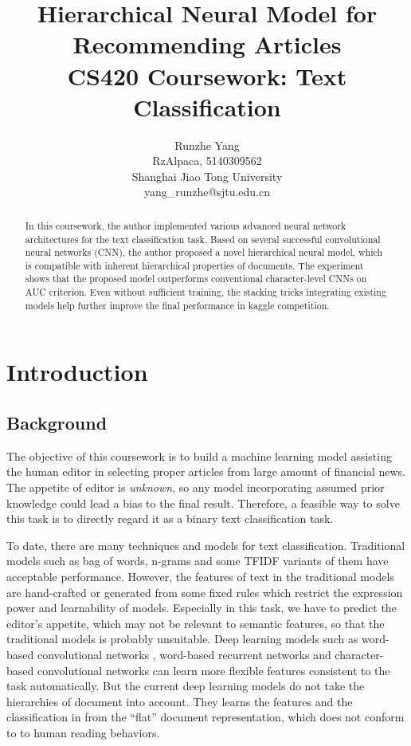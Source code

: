 \documentclass{article}
\title{Hierarchical Neural Model for Recommending Articles\\
		\Large{CS420 Coursework: Text Classification}}
\author{Runzhe Yang\\
{\small RzAlpaca, 5140309562} \\
{\small Shanghai Jiao Tong University}\\
{\small \textsf{yang\_runzhe@sjtu.edu.cn}}}
\begin{document}
\maketitle

\begin{abstract}
In this coursework, the author implemented various advanced neural network architectures for the text classification task. Based on several successful convolutional neural networks (CNN), the author proposed a novel hierarchical neural model, which is compatible with inherent hierarchical properties of documents. The experiment shows that the proposed model outperforms conventional character-level CNNs on AUC criterion. Even without sufficient training, the stacking tricks integrating existing models help further improve the final performance in kaggle competition.
\end{abstract}

\section{Introduction}\label{sec:intro}
\subsection{Background}\label{sec:bg}
The objective of this coursework is to build a machine learning model assisting the human editor in selecting proper articles from large amount of financial news. The appetite of editor is {\em unknown}, so any model incorporating assumed prior knowledge could lead a bias to the final result. Therefore, a feasible way to solve this task is to directly regard it as a binary text classification task.

To date, there are many techniques and models for text classification. Traditional models such as bag of words, n-grams and some TFIDF variants of them have acceptable performance. However, the features of text in the traditional models are hand-crafted or generated from some fixed rules which restrict the expression power and learnability of models. Especially in this task, we have to predict the editor's appetite, which may not be relevant to semantic features, so that the traditional models is probably unsuitable. Deep learning models such as word-based convolutional networks \cite{Wang:2015ts, Zhang:2015tp} , word-based  recurrent networks and character-based convolutional networks \cite{Zhang:2015vu} can learn more flexible features consistent to the task automatically. But the current deep learning models do not take the hierarchies of document into account. They learns the features and the classification in from the ``flat'' document representation, which does not conform to to human reading behaviors.
\end{document}
